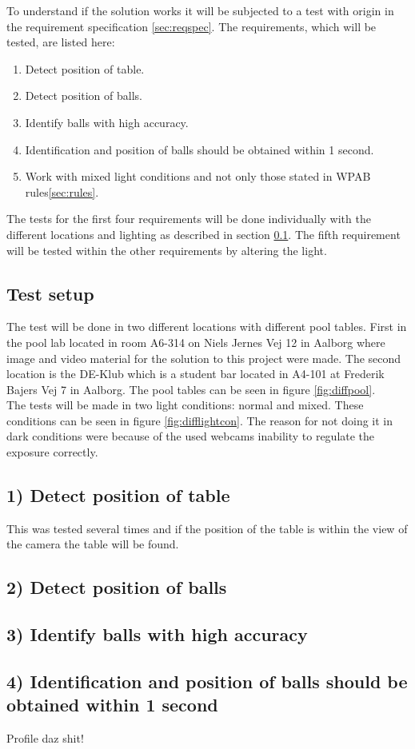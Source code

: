 To understand if the solution works it will be subjected to a test with origin in the requirement specification \ref{sec:reqspec}. The requirements, which will be tested, are listed here:

\begin{enumerate}
	\item Detect position of table.
	\item Detect position of balls.
	\item Identify balls with high accuracy.
	\item Identification and position of balls should be obtained within 1 second.
	\item Work with mixed light conditions and not only those stated in WPAB rules\ref{sec:rules}.
\end{enumerate}

The tests for the first four requirements will be done individually with the different locations and lighting as described in section \ref{sec:testsetup}. The fifth requirement will be tested within the other requirements by altering the light.

\subsection{Test setup}
\label{sec:testsetup}
The test will be done in two different locations with different pool tables. First in the pool lab located in room A6-314 on Niels Jernes Vej 12 in Aalborg where image and video material for the solution to this project were made. The second location is the DE-Klub which is a student bar located in A4-101 at Frederik Bajers Vej 7 in Aalborg. The pool tables can be seen in figure \ref{fig:diffpool}.\\

The tests will be made in two light conditions: normal and mixed. These conditions can be seen in figure \ref{fig:difflightcon}. The reason for not doing it in dark conditions were because of the used webcams inability to regulate the exposure correctly.\\


\subsection{1) Detect position of table}

This was tested several times and if the position of the table is within the view of the camera the table will be found.\\

\subsection{2) Detect position of balls}



\subsection{3) Identify balls with high accuracy}



\subsection{4) Identification and position of balls should be obtained within 1 second}

Profile daz shit!

